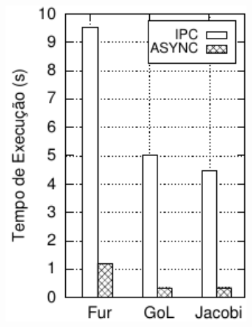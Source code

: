 \begin{figure}
  \centering
  \caption{\async \textit{vs.} \ipc}
  \begin{subfigure}{0.4\textwidth}
    \centering
    \includegraphics[width=1\textwidth]{figs/ComparisonTimeTiles1.pdf}
    \label{fig:compara-tempo}
  \end{subfigure}
  \begin{subfigure}{0.4\textwidth}
    \centering

\end{subfigure}
\end{figure}
